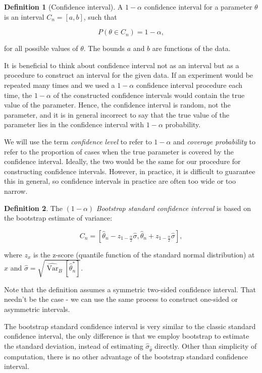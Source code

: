 \documentclass{book}
\theoremstyle{plain}%
\theoremstyle{definition}
\newtheorem{definition}{Definition}[section]
\DeclareMathOperator{\Var}{Var}
\newlength{\arrow}
\begin{document}
\begin{definition}[Confidence interval]
A $1-\alpha$ confidence interval for a parameter $\theta$ is an interval $C_n = [a,b]$, such that 

$$P(\theta \in C_n) = 1-\alpha,$$

for all possible values of $\theta$. The bounds $a$ and $b$ are functions of the data.
\end{definition}

It is beneficial to think about confidence interval not as an interval but as a procedure to construct an interval for the given data. If an experiment would be repeated many times and we used a $1 - \alpha$ confidence interval procedure each time, the $1 - \alpha$ of the constructed confidence intervals would contain the true value of the parameter. Hence, the confidence interval is random, not the parameter, and it is in general incorrect to say that the true value of the parameter lies in the confidence interval with $1 - \alpha$ probability.

We will use the term \emph{confidence level} to refer to $1 - \alpha$ and \emph{coverage probability} to refer to the proportion of 
cases when the true parameter is covered by the confidence interval. Ideally, the two would be the same for our procedure for constructing confidence intervals. However, in practice, it is difficult to guarantee this in general, so confidence intervals in practice are often too wide or too narrow.

\begin{definition} The $(1 - \alpha)$ \emph{Bootstrap standard confidence interval} is based on the bootstrap estimate of variance:

$$C_n = [\hat{\theta}_n - z_{1-\frac{ \alpha}{2}}\hat{\sigma},\hat{\theta}_n + z_{1-\frac{ \alpha}{2}}\hat{\sigma}],$$

where $z_x$ is the z-score (quantile function of the  standard normal distribution) at $x$ and $\hat{\sigma} = \sqrt{\widehat{\Var}_B[\hat{\theta}^*_n]}$.
\end{definition}

Note that the definition assumes a symmetric two-sided confidence interval. That needn't be the case - we can use the same process to construct one-sided or asymmetric intervals.

The bootstrap standard confidence interval is very similar to the classic standard confidence interval, the only difference is that we employ bootstrap to estimate the standard deviation, instead of estimating $\hat{\sigma}_{\hat{\theta}}$ directly. Other than simplicity of computation, there is no other advantage of the bootstrap standard confidence interval.
\end{document}
